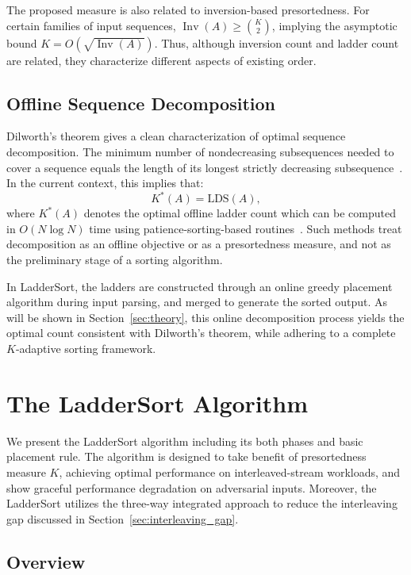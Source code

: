 \documentclass{ieeeaccess}
\theoremstyle{plain}
\theoremstyle{definition}
\DeclareMathOperator{\Inv}{Inv}
\begin{document}
The proposed measure is also related to inversion-based presortedness. For certain families of input sequences, $\Inv(A)\ge\binom{K}{2}$, implying the asymptotic bound $K=O(\sqrt{\Inv(A)})$. Thus, although inversion count and ladder count are related, they characterize different aspects of existing order.


\subsection{Offline Sequence Decomposition}
\label{sec:dilworth}

Dilworth's theorem gives a clean characterization of optimal sequence decomposition. The minimum number of nondecreasing subsequences needed to cover a sequence equals the length of its longest strictly decreasing subsequence~\cite{Dilworth1950}. In the current context, this implies that:
\[
K^*(A) = \mathrm{LDS}(A),
\]
where $K^*(A)$ denotes the optimal offline ladder count which can be computed in $O(N\log N)$ time using  patience-sorting-based routines~\cite{Fredman1975,AldousDiaconis1999}. Such methods treat decomposition as an offline objective or as a presortedness measure, and not as the preliminary stage of a sorting algorithm.

In LadderSort, the ladders are constructed through an online greedy placement algorithm during input parsing, and merged to generate the sorted output. As will be shown in Section~\ref{sec:theory}, this online decomposition process yields the optimal count consistent with Dilworth's theorem, while adhering to a complete $K$-adaptive sorting framework.

\section{The LadderSort Algorithm}
\label{sec:algorithm}
We present the LadderSort algorithm including its both phases and basic placement rule. The algorithm is designed to take benefit of presortedness measure $K$, achieving optimal performance on interleaved-stream workloads, and show graceful performance degradation on adversarial inputs. Moreover, the LadderSort utilizes the three-way integrated approach to reduce the interleaving gap discussed in Section~\ref{sec:interleaving_gap}. 

\subsection{Overview}
\end{document}
